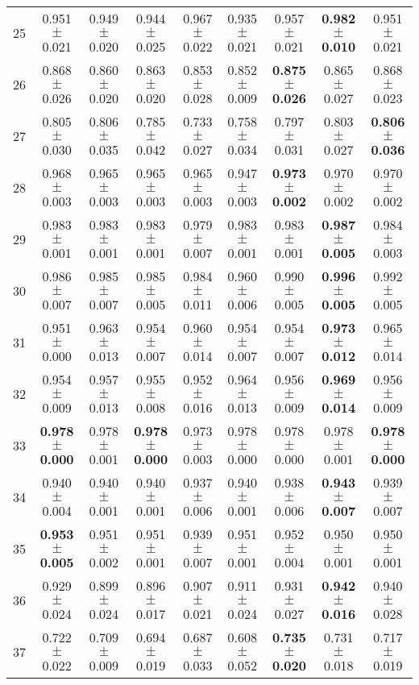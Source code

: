 \begin{table}[!ht]
{\begin{tabular}{r c c c c c c c c}
25 & 0.951 $\pm$ 0.021 & 0.949 $\pm$ 0.020 & 0.944 $\pm$ 0.025 & 0.967 $\pm$ 0.022 & 0.935 $\pm$ 0.021 & 0.957 $\pm$ 0.021 & \textbf{0.982 $\pm$ 0.010} & 0.951 $\pm$ 0.021 \\
26 & 0.868 $\pm$ 0.026 & 0.860 $\pm$ 0.020 & 0.863 $\pm$ 0.020 & 0.853 $\pm$ 0.028 & 0.852 $\pm$ 0.009 & \textbf{0.875 $\pm$ 0.026} & 0.865 $\pm$ 0.027 & 0.868 $\pm$ 0.023 \\
27 & 0.805 $\pm$ 0.030 & 0.806 $\pm$ 0.035 & 0.785 $\pm$ 0.042 & 0.733 $\pm$ 0.027 & 0.758 $\pm$ 0.034 & 0.797 $\pm$ 0.031 & 0.803 $\pm$ 0.027 & \textbf{0.806 $\pm$ 0.036} \\
28 & 0.968 $\pm$ 0.003 & 0.965 $\pm$ 0.003 & 0.965 $\pm$ 0.003 & 0.965 $\pm$ 0.003 & 0.947 $\pm$ 0.003 & \textbf{0.973 $\pm$ 0.002} & 0.970 $\pm$ 0.002 & 0.970 $\pm$ 0.002 \\
29 & 0.983 $\pm$ 0.001 & 0.983 $\pm$ 0.001 & 0.983 $\pm$ 0.001 & 0.979 $\pm$ 0.007 & 0.983 $\pm$ 0.001 & 0.983 $\pm$ 0.001 & \textbf{0.987 $\pm$ 0.005} & 0.984 $\pm$ 0.003 \\
30 & 0.986 $\pm$ 0.007 & 0.985 $\pm$ 0.007 & 0.985 $\pm$ 0.005 & 0.984 $\pm$ 0.011 & 0.960 $\pm$ 0.006 & 0.990 $\pm$ 0.005 & \textbf{0.996 $\pm$ 0.005} & 0.992 $\pm$ 0.005 \\
31 & 0.951 $\pm$ 0.000 & 0.963 $\pm$ 0.013 & 0.954 $\pm$ 0.007 & 0.960 $\pm$ 0.014 & 0.954 $\pm$ 0.007 & 0.954 $\pm$ 0.007 & \textbf{0.973 $\pm$ 0.012} & 0.965 $\pm$ 0.014 \\
32 & 0.954 $\pm$ 0.009 & 0.957 $\pm$ 0.013 & 0.955 $\pm$ 0.008 & 0.952 $\pm$ 0.016 & 0.964 $\pm$ 0.013 & 0.956 $\pm$ 0.009 & \textbf{0.969 $\pm$ 0.014} & 0.956 $\pm$ 0.009 \\
33 & \textbf{0.978 $\pm$ 0.000} & 0.978 $\pm$ 0.001 & \textbf{0.978 $\pm$ 0.000} & 0.973 $\pm$ 0.003 & 0.978 $\pm$ 0.000 & 0.978 $\pm$ 0.000 & 0.978 $\pm$ 0.001 & \textbf{0.978 $\pm$ 0.000} \\
34 & 0.940 $\pm$ 0.004 & 0.940 $\pm$ 0.001 & 0.940 $\pm$ 0.001 & 0.937 $\pm$ 0.006 & 0.940 $\pm$ 0.001 & 0.938 $\pm$ 0.006 & \textbf{0.943 $\pm$ 0.007} & 0.939 $\pm$ 0.007 \\
35 & \textbf{0.953 $\pm$ 0.005} & 0.951 $\pm$ 0.002 & 0.951 $\pm$ 0.001 & 0.939 $\pm$ 0.007 & 0.951 $\pm$ 0.001 & 0.952 $\pm$ 0.004 & 0.950 $\pm$ 0.001 & 0.950 $\pm$ 0.001 \\
36 & 0.929 $\pm$ 0.024 & 0.899 $\pm$ 0.024 & 0.896 $\pm$ 0.017 & 0.907 $\pm$ 0.021 & 0.911 $\pm$ 0.024 & 0.931 $\pm$ 0.027 & \textbf{0.942 $\pm$ 0.016} & 0.940 $\pm$ 0.028 \\
37 & 0.722 $\pm$ 0.022 & 0.709 $\pm$ 0.009 & 0.694 $\pm$ 0.019 & 0.687 $\pm$ 0.033 & 0.608 $\pm$ 0.052 & \textbf{0.735 $\pm$ 0.020} & 0.731 $\pm$ 0.018 & 0.717 $\pm$ 0.019 \\

\end{tabular}}
\end{table}
